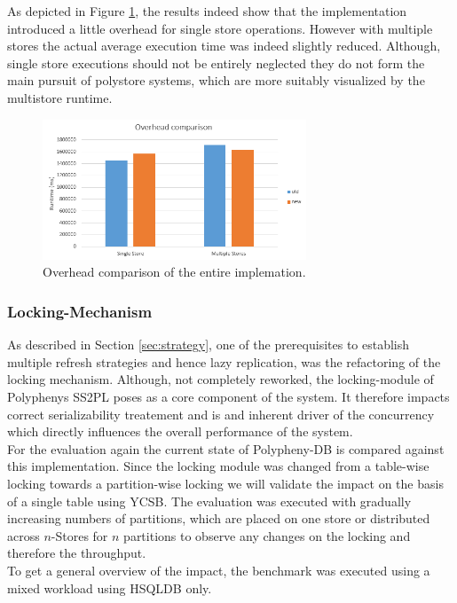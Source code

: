 As depicted in Figure \ref{fig:overhead}, the results indeed show that the implementation introduced a little overhead for single store operations.
However with multiple stores the actual average execution time was indeed slightly reduced. Although, single store executions should not be entirely neglected
they do not form the main pursuit of polystore systems, which are more suitably visualized by the multistore runtime.



\begin{figure}[t] 
    \centering 
    \includegraphics[width=0.7\textwidth]{Figures/overhead.png}
    \caption{Overhead comparison of the entire implemation.}
    \label{fig:overhead}
\end{figure}


\subsubsection{Locking-Mechanism} 

As described in Section \ref{sec:strategy}, one of the prerequisites to establish multiple refresh strategies and hence lazy replication,  
was the refactoring of the locking mechanism. Although, not completely reworked, the locking-module of Polyphenys SS2PL 
poses as a core component of the system. It therefore  impacts correct serializability treatement and is and inherent driver of 
the concurrency which directly influences the overall performance of the system.\\
For the evaluation again the current state of Polypheny-DB is compared against this implementation.
Since the locking module was changed from a table-wise locking towards a partition-wise locking we will validate the impact on the basis of 
a single table using YCSB. 
The evaluation was executed with gradually increasing numbers of partitions, which are placed on one store or distributed across $n$-Stores 
for $n$ partitions to observe any changes on the locking and therefore the throughput.\\
To get a general overview of the impact, the benchmark was executed using a mixed workload using HSQLDB only.\\

